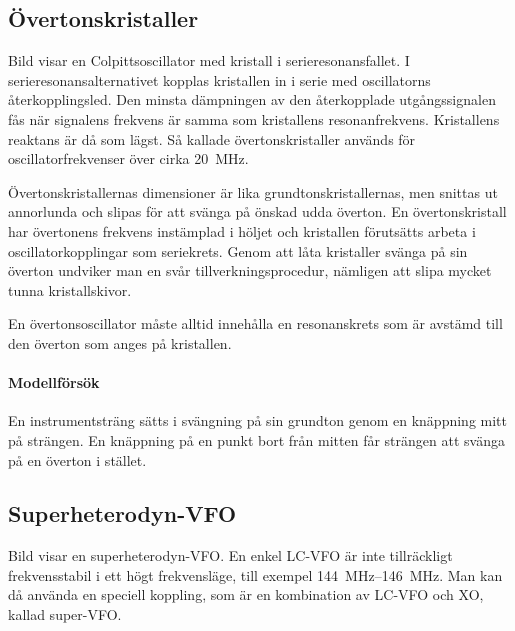 \subsection{Övertonskristaller}


Bild  visar en Colpittsoscillator med kristall i
serieresonansfallet.
I serieresonansalternativet kopplas kristallen in i serie med
oscillatorns återkopplingsled.
Den minsta dämpningen av den återkopplade utgångssignalen fås när signalens
frekvens är samma som kristallens resonanfrekvens.
Kristallens reaktans är då som lägst.
Så kallade övertonskristaller används för oscillatorfrekvenser över cirka
\SI{20}{\mega\hertz}.

Övertonskristallernas dimensioner är lika grundtonskristallernas, men
snittas ut annorlunda och slipas för att svänga på önskad udda överton.
En övertonskristall har övertonens frekvens instämplad i höljet och kristallen
förutsätts arbeta i oscillatorkopplingar som seriekrets.
Genom att låta kristaller svänga på sin överton undviker man en svår
tillverkningsprocedur, nämligen att slipa mycket tunna kristallskivor.

En övertonsoscillator måste alltid innehålla en resonanskrets som är
avstämd till den överton som anges på kristallen.

\paragraph{Modellförsök}
En instrumentsträng sätts i svängning på sin grundton genom en knäppning mitt
på strängen.
En knäppning på en punkt bort från mitten får strängen att svänga på en överton
i stället.

\subsection{Superheterodyn-VFO}
\label{superVFO}


Bild  visar en superheterodyn-VFO.
En enkel LC-VFO är inte tillräckligt frekvensstabil i ett högt frekvensläge,
till exempel \SIrange{144}{146}{\mega\hertz}.
Man kan då använda en speciell koppling, som är en kombination av LC-VFO och
XO, kallad super-VFO.

